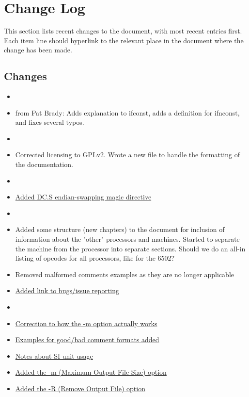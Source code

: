 \section*{Change Log}
\label{section:changelog}

This section lists recent changes to the document, with most recent entries first. Each item line should hyperlink to the relevant place in the document where the change has been made.

\subsection*{Changes}

\begin{itemize}

\item[]
\item[] from Pat Brady: Adds explanation to ifconst, adds a definition for ifnconst, and fixes several typos.


\item[]
\item[] Corrected licensing to GPLv2. Wrote a new  file to handle the formatting of the documentation.

\item[]
\item \hyperref[changelog:20200915endian]{Added DC.S endian-swapping magic directive}

\item[]
\item Added some structure (new chapters) to the document for inclusion of information about the "other" processors and machines. Started to separate the machine from the processor into separate sections. Should we do an all-in listing of opcodes for all processors, like for the 6502?
\item Removed malformed comments examples as they are no longer applicable
\item \hyperref[changelog:20200913bugs]{Added link to bugs/issue reporting}

\item[]
\item \hyperref[changelog:20200908optionm]{Correction to how the -m option actually works}
\item \hyperref[changelog:20200909comment]{Examples for good/bad comment formats added}
\item \hyperref[changelog:20200909SI]{Notes about SI unit usage}
\item \hyperref[flag:maximum]{Added the -m (Maximum Output File Size) option}
\item \hyperref[flag:remove]{Added the -R (Remove Output File) option}


\end{itemize}
